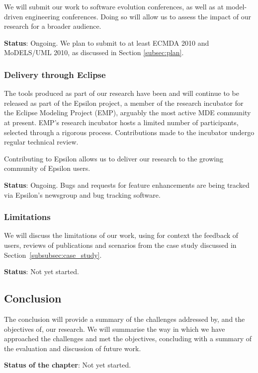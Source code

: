 We will submit our work to software evolution conferences, as well as at model-driven engineering conferences. Doing so will allow us to assess the impact of our research for a broader audience.

\textbf{Status}: Ongoing. We plan to submit to at least ECMDA 2010 and MoDELS/UML 2010, as discussed in Section \ref{subsec:plan}.


\subsubsection{Delivery through Eclipse}
The tools produced as part of our research have been and will continue to be released as part of the Epsilon project, a member of the research incubator for the Eclipse Modeling Project (EMP), arguably the most active MDE community at present. EMP's research incubator hosts a limited number of participants, selected through a rigorous process. Contributions made to the incubator undergo regular technical review.

Contributing to Epsilon allows us to deliver our research to the growing community \cite{kolovos08thesis} of Epsilon users.

\textbf{Status}: Ongoing. Bugs and requests for feature enhancements are being tracked via Epsilon's newsgroup and bug tracking software.


\subsubsection{Limitations}
We will discuss the limitations of our work, using for context the feedback of users, reviews of publications and scenarios from the case study discussed in Section~\ref{subsubsec:case_study}.

\textbf{Status}: Not yet started.


\subsection{Conclusion}
The conclusion will provide a summary of the challenges addressed by, and the objectives of, our research. We will summarise the way in which we have approached the challenges and met the objectives, concluding with a summary of the evaluation and discussion of future work. 

\textbf{Status of the chapter}: Not yet started.